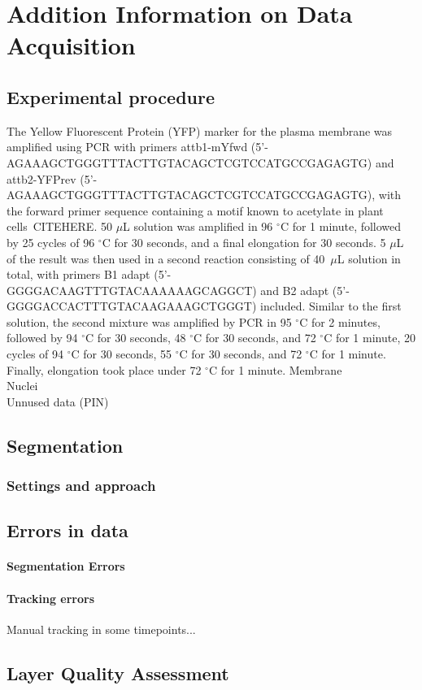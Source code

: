 \chapter{Addition Information on Data Acquisition} 

\section{Experimental procedure} 
The Yellow Fluorescent Protein (YFP) marker for the plasma membrane was
amplified using PCR with primers attb1-mYfwd
(5'-AGAAAGCTGGGTTTACTTGTACAGCTCGTCCATGCCGAGAGTG) and attb2-YFPrev
(5'-AGAAAGCTGGGTTTACTTGTACAGCTCGTCCATGCCGAGAGTG), with the forward primer
sequence containing a motif known to acetylate in plant cells~CITEHERE. 50
$\mu$L solution was amplified in 96 $^\circ$C for 1 minute, followed by 25
cycles of 96 $^\circ$C for 30 seconds, and a final elongation for 30 seconds. 5
$\mu$L of the result was then used in a second reaction consisting of
40~$\mu$L solution in total, with primers B1 adapt (5'-GGGGACAAGTTTGTACAAAAAAGCAGGCT)
and B2 adapt (5'-GGGGACCACTTTGTACAAGAAAGCTGGGT) included. Similar to the first
solution, the second mixture was amplified by PCR in 95 $^\circ$C for 2 minutes,
followed by 94 $^\circ$C for 30 seconds, 48 $^\circ$C for 30 seconds, and 72
$^\circ$C for 1 minute, 20 cycles of 94 $^\circ$C for 30 seconds,
55 $^\circ$C for 30 seconds, and 72 $^\circ$C for 1 minute. Finally, elongation
took place under 72 $^\circ$C for 1 minute.
Membrane \\
Nuclei \\
Unnused data (PIN) \\

\section{Segmentation}
\subsection{Settings and approach}

\section{Errors in data}
\label{sec:data_errors}

\subsubsection{Segmentation Errors}
\label{sec:data_errors_segmentation}

\subsubsection{Tracking errors}
\label{sec:data_errors_tracking}
Manual tracking in some timepoints...

\section{Layer Quality Assessment}



